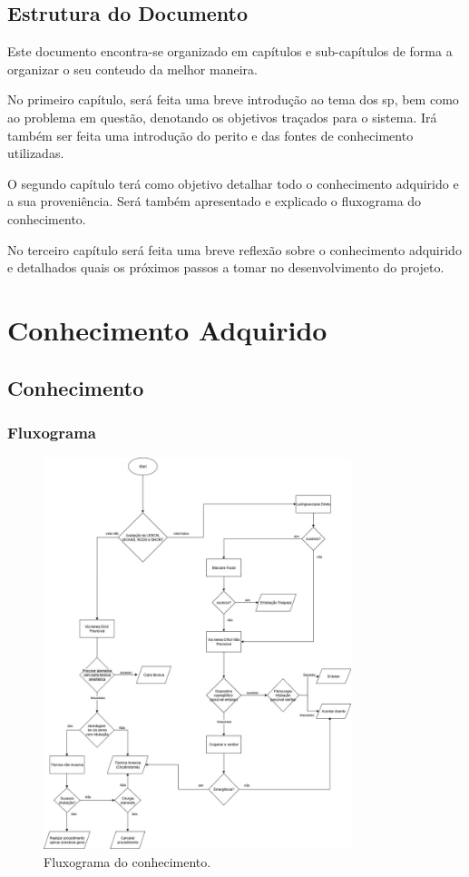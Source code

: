 \documentclass[a4paper,12pt,twoside]{article}
\begin{document}
    \subsection{Estrutura do Documento}

    Este documento encontra-se organizado em capítulos e sub-capítulos de forma a organizar o seu conteudo da melhor maneira.

    No primeiro capítulo, será feita uma breve introdução ao tema dos \gls{sp}, bem como ao problema em questão, denotando os objetivos traçados para o sistema. Irá também ser feita uma introdução do perito e das fontes de conhecimento utilizadas.

    O segundo capítulo terá como objetivo detalhar todo o conhecimento adquirido e a sua proveniência. Será também apresentado e explicado o fluxograma do conhecimento.\@

    No terceiro capítulo será feita uma breve reflexão sobre o conhecimento adquirido e detalhados quais os próximos passos a tomar no desenvolvimento do projeto.

    \newpage


    \section{Conhecimento Adquirido}
    \subsection{Conhecimento}
    \subsubsection{Fluxograma}
    \begin{figure}[H]
        \centering
        \includegraphics[width=0.8\textwidth]{./resources/pdf/Conhecimento.jpg}
        \caption{Fluxograma do conhecimento.}
        \label{fig:fluxograma}
    \end{figure}
\end{document}
